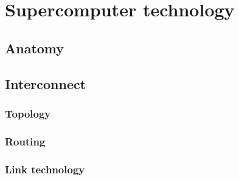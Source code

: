 	
	\section{Supercomputer technology}
		\label{sec:supercomputers}
		
		
		\subsection{Anatomy}
			
		
		\subsection{Interconnect}
			
			
			\subsubsection{Topology}
				
			
			\subsubsection{Routing}
				
			
			\subsubsection{Link technology}
				
	
